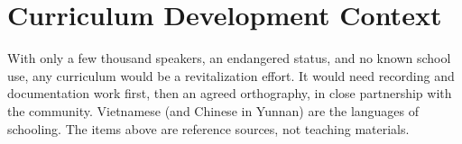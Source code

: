 \documentclass[12pt]{article}
\begin{document}
\section{Curriculum Development Context}
With only a few thousand speakers, an endangered status, and no known school use, any curriculum would be a revitalization effort. It would need recording and documentation work first, then an agreed orthography, in close partnership with the community. Vietnamese (and Chinese in Yunnan) are the languages of schooling. The items above are reference sources, not teaching materials.
\end{document}

